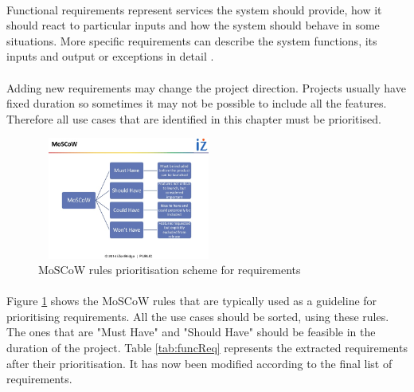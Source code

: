 \documentclass{l4proj}
\begin{document}
\paragraph{}
Functional requirements represent services the system should provide, how it should react to particular inputs and how the system should behave in some situations. More specific requirements can describe the system functions, its inputs and output or exceptions in detail \cite{sene}. 
\paragraph{}
Adding new requirements may change the project direction. Projects usually have fixed duration so sometimes it may not be possible to include all the features. Therefore all use cases that are identified in this chapter must be prioritised. 

\begin{figure}[H]
	\centering
	\includegraphics[height=4cm,width=6cm]{images/MoSCoW}
	\caption{MoSCoW rules prioritisation scheme for requirements}
	\label{MoSCoW}
\end{figure} 
\paragraph{}
Figure \ref{MoSCoW} shows the MoSCoW rules that are typically used as a guideline for prioritising requirements. All the use cases should be sorted, using these rules. The ones that are "Must Have" and "Should Have" should be feasible in the duration of the project. Table \ref{tab:funcReq} represents the extracted requirements after their prioritisation. It has now been modified according to the final list of requirements.
\end{document}
